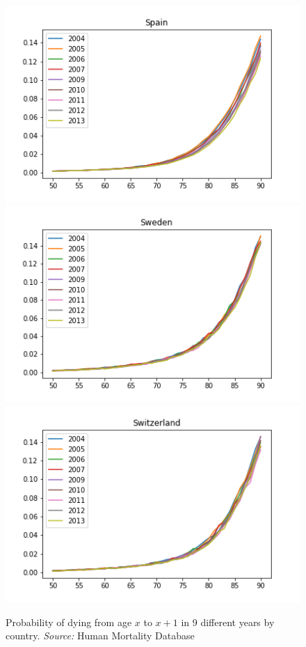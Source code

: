 \begin{figure}[H]
\endminipage\hfill
{}
  \includegraphics[width=\linewidth]{images/mortality_female_7.png}
\endminipage\hfill
{}
  \includegraphics[width=\linewidth]{images/mortality_female_8.png}
\endminipage\hfill
{}%
  \includegraphics[width=\linewidth]{images/mortality_female_9.png}
\endminipage\hfill
\caption{Probability of dying from age $x$ to $x+1$ in 9 different years by country. \textit{Source:} Human Mortality Database}
\label{dying_female}
\end{figure}



